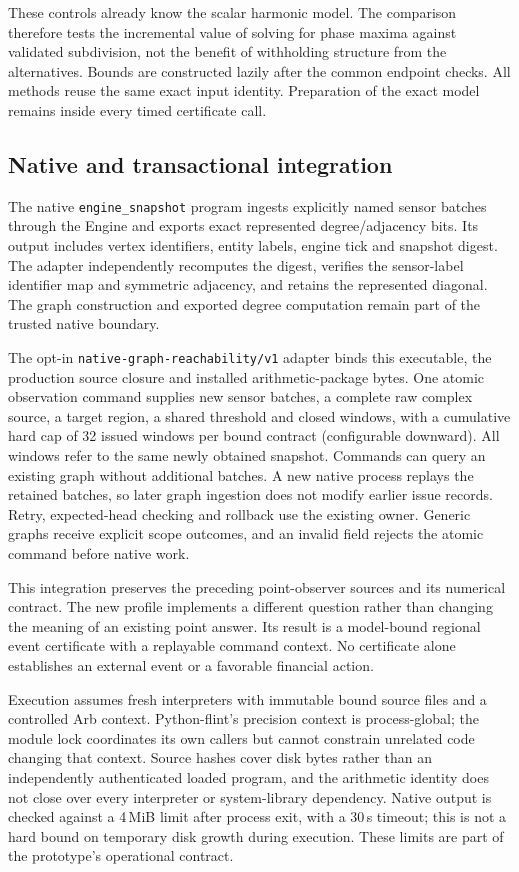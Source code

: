 \documentclass[11pt,a4paper]{article}
\theoremstyle{definition}\newtheorem{definition}[theorem]{Definition}
\begin{document}
These controls already know the scalar harmonic model. The comparison therefore tests the incremental value of solving for phase maxima against validated subdivision, not the benefit of withholding structure from the alternatives. Bounds are constructed lazily after the common endpoint checks. All methods reuse the same exact input identity. Preparation of the exact model remains inside every timed certificate call.

\subsection{Native and transactional integration}\label{sec:windowintegration}
The native \texttt{engine\_snapshot} program ingests explicitly named sensor batches through the Engine and exports exact represented degree/adjacency bits. Its output includes vertex identifiers, entity labels, engine tick and snapshot digest. The adapter independently recomputes the digest, verifies the sensor-label identifier map and symmetric adjacency, and retains the represented diagonal. The graph construction and exported degree computation remain part of the trusted native boundary.

The opt-in \texttt{native-graph-reachability/v1} adapter binds this executable, the production source closure and installed arithmetic-package bytes. One atomic observation command supplies new sensor batches, a complete raw complex source, a target region, a shared threshold and closed windows, with a cumulative hard cap of 32 issued windows per bound contract (configurable downward). All windows refer to the same newly obtained snapshot. Commands can query an existing graph without additional batches. A new native process replays the retained batches, so later graph ingestion does not modify earlier issue records. Retry, expected-head checking and rollback use the existing owner. Generic graphs receive explicit scope outcomes, and an invalid field rejects the atomic command before native work.

This integration preserves the preceding point-observer sources and its numerical contract. The new profile implements a different question rather than changing the meaning of an existing point answer. Its result is a model-bound regional event certificate with a replayable command context. No certificate alone establishes an external event or a favorable financial action.

Execution assumes fresh interpreters with immutable bound source files and a controlled Arb context. Python-flint's precision context is process-global; the module lock coordinates its own callers but cannot constrain unrelated code changing that context. Source hashes cover disk bytes rather than an independently authenticated loaded program, and the arithmetic identity does not close over every interpreter or system-library dependency. Native output is checked against a 4\,MiB limit after process exit, with a 30\,s timeout; this is not a hard bound on temporary disk growth during execution. These limits are part of the prototype's operational contract.
\end{document}
